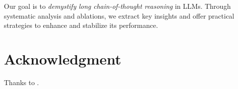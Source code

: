 \documentclass{article}
\begin{document}










\begin{tcolorbox}[colback=lightgray!10, colframe=black, title={Research Aim}]
    Our goal is to \textit{demystify long chain-of-thought reasoning} in LLMs. Through systematic analysis and ablations, we extract key insights and offer practical strategies to enhance and stabilize its performance.
\end{tcolorbox}
\vspace{-10pt}

\section*{Acknowledgment}
Thanks to \lipsum[10].

\listoftodos





\end{document}
